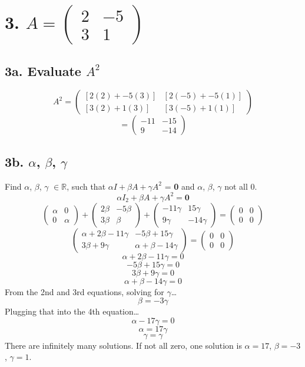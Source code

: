 \documentclass[11pt]{article}
\begin{document}
\section*{3. \(A =
    \begin{pmatrix}
        2 & -5 \\
        3 & 1
    \end{pmatrix}
    \)
    }

\subsection*{3a. Evaluate \(A^2\)}
\[
    A^2 = \begin{pmatrix}
            [2(2) + -5(3)] & [2(-5) + -5(1)] \\
            [3(2) + 1(3)] & [3(-5) + 1(1)]
    \end{pmatrix}
\]
\[
    = \begin{pmatrix}
        -11 & -15 \\
        9 & -14
    \end{pmatrix}
\]

\subsection*{3b. \(\alpha\), \(\beta\), \(\gamma\)}
Find \(\alpha\), \(\beta\), \(\gamma\) \(\in \mathbb{R}\), such that \(\alpha I + \beta A + \gamma A^2\) = \textbf{0} and \(\alpha\), \(\beta\), \(\gamma\) not all 0.
\[
    \alpha I_2 + \beta A + \gamma A^2 = \textbf{0}
\]
\[
    \begin{pmatrix}
        \alpha & 0 \\
        0 & \alpha
    \end{pmatrix} + 
    \begin{pmatrix}
        2\beta & -5\beta \\
        3\beta & \beta
    \end{pmatrix} +
    \begin{pmatrix}
        -11\gamma & 15\gamma \\
        9\gamma & -14\gamma
    \end{pmatrix} = 
    \begin{pmatrix}
        0 & 0 \\
        0 & 0
    \end{pmatrix}
\]
\[
    \begin{pmatrix}
        \alpha + 2\beta - 11\gamma & -5\beta + 15\gamma \\
        3\beta + 9\gamma & \alpha + \beta - 14\gamma
    \end{pmatrix} = 
    \begin{pmatrix}
        0 & 0 \\
        0 & 0
    \end{pmatrix}
\]
\[
    \alpha + 2\beta - 11\gamma = 0
\]
\[
    -5\beta + 15\gamma = 0
\]
\[
    3\beta + 9\gamma = 0
\]
\[
    \alpha + \beta - 14\gamma = 0
\]
From the 2nd and 3rd equations, solving for \(\gamma\)\dots
\[
    \beta = -3\gamma
\]
Plugging that into the 4th equation\dots
\[
    \alpha - 17\gamma = 0
\]
\[
    \alpha = 17\gamma
\]
\[
    \gamma = \gamma
\]
There are infinitely many solutions. If not all zero, one solution is \(\alpha = 17\), \(\beta = -3\), \(\gamma = 1\). \pagebreak
\end{document}
